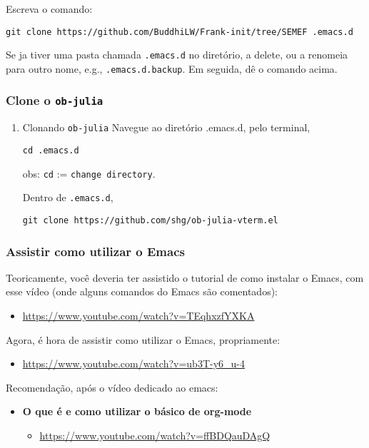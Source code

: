 \documentclass[11pt]{article}
\begin{document}
Escreva o comando:

\begin{verbatim}
git clone https://github.com/BuddhiLW/Frank-init/tree/SEMEF .emacs.d
\end{verbatim}

Se ja tiver uma pasta chamada \texttt{.emacs.d} no diretório, a delete, ou a
renomeia para outro nome, e.g., \texttt{.emacs.d.backup}. Em seguida, dê o
comando acima.

\subsubsection{Clone o \texttt{ob-julia}}
\label{sec:orgbc51835}
\begin{enumerate}
\item Clonando \texttt{ob-julia}
\label{sec:org7854ad0}
Navegue ao diretório .emacs.d, pelo terminal,
\begin{verbatim}
cd .emacs.d
\end{verbatim}

obs: \texttt{cd} := \texttt{change directory}.

Dentro de \texttt{.emacs.d},
\begin{verbatim}
git clone https://github.com/shg/ob-julia-vterm.el
\end{verbatim}
\end{enumerate}

\subsubsection{Assistir como utilizar o Emacs}
\label{sec:orgd7f1b7a}

Teoricamente, você deveria ter assistido o tutorial de como instalar o
Emacs, com esse vídeo (onde alguns comandos do Emacs são comentados):
\begin{itemize}
\item \url{https://www.youtube.com/watch?v=TEqhxzfYXKA}
\end{itemize}

Agora, é hora de assistir como utilizar o Emacs, propriamente:
\begin{itemize}
\item \url{https://www.youtube.com/watch?v=ub3T-y6\_u-4}
\end{itemize}

Recomendação, após o vídeo dedicado ao emacs:

\begin{itemize}
\item \textbf{O que é e como utilizar o básico de org-mode}
\begin{itemize}
\item \url{https://www.youtube.com/watch?v=ffBDQauDAgQ}
\end{itemize}
\end{itemize}
\end{document}
